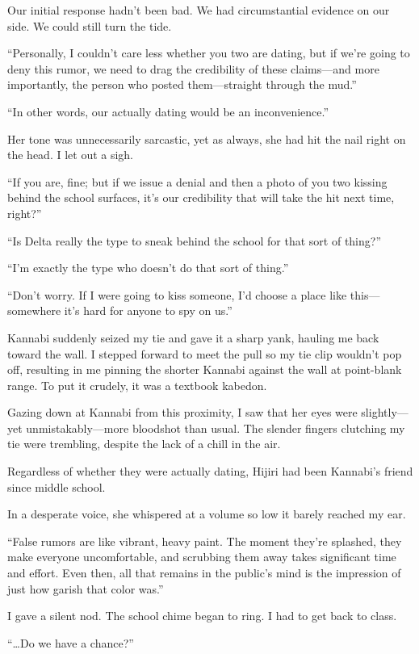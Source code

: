 \documentclass[
    a4paper,
    12pt,
    twoside,
    openany,
    UTF8,
    fontset=windows
]{ctexbook}
\begin{document}
Our initial response hadn't been bad. We had circumstantial evidence on our side. We could still turn the tide.

``Personally, I couldn't care less whether you two are dating, but if we're going to deny this rumor, we need to drag the credibility of these claims---and more importantly, the person who posted them---straight through the mud.''

``In other words, our actually dating would be an inconvenience.''

Her tone was unnecessarily sarcastic, yet as always, she had hit the nail right on the head. I let out a sigh.

``If you are, fine; but if we issue a denial and then a photo of you two kissing behind the school surfaces, it's our credibility that will take the hit next time, right?''

``Is Delta really the type to sneak behind the school for that sort of thing?''

``I'm exactly the type who doesn't do that sort of thing.''

``Don't worry. If I were going to kiss someone, I'd choose a place like this---somewhere it's hard for anyone to spy on us.''

Kannabi suddenly seized my tie and gave it a sharp yank, hauling me back toward the wall. I stepped forward to meet the pull so my tie clip wouldn't pop off, resulting in me pinning the shorter Kannabi against the wall at point-blank range. To put it crudely, it was a textbook kabedon.

Gazing down at Kannabi from this proximity, I saw that her eyes were slightly---yet unmistakably---more bloodshot than usual. The slender fingers clutching my tie were trembling, despite the lack of a chill in the air.

Regardless of whether they were actually dating, Hijiri had been Kannabi's friend since middle school.

In a desperate voice, she whispered at a volume so low it barely reached my ear.

``False rumors are like vibrant, heavy paint. The moment they're splashed, they make everyone uncomfortable, and scrubbing them away takes significant time and effort. Even then, all that remains in the public's mind is the impression of just how garish that color was.''

I gave a silent nod. The school chime began to ring. I had to get back to class.

``\dots Do we have a chance?''
\end{document}

